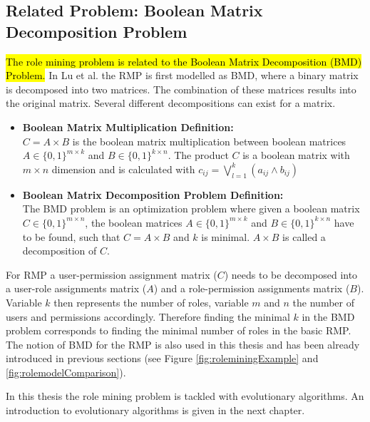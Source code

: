    \subsection{Related Problem: Boolean Matrix Decomposition Problem}
    \hl{The role mining problem is related to the Boolean Matrix Decomposition (BMD) Problem.} In Lu et al.\cite{4497438} the RMP is first modelled as BMD, where a binary matrix is decomposed into two matrices. The combination of these matrices results into the original matrix. Several different decompositions can exist for a matrix.
    \begin{itemize}
    \item \textbf{Boolean Matrix Multiplication Definition:}\\
    $C = A \times B$ is the boolean matrix multiplication between boolean matrices $A \in \{0,1\}^{m \times k}$ and $B \in \{0,1\}^{k \times n}$. The product $C$ is a boolean matrix with $m \times n$ dimension and is calculated with $c_{ij} = \bigvee_{l=1}^{k}(a_{ij} \wedge b_{ij})$
     \item \textbf{Boolean Matrix Decomposition Problem Definition:}\\
    The BMD problem is an optimization problem where given a boolean matrix $C \in \{0,1\}^{m \times n}$, the boolean matrices $A \in \{0,1\}^{m \times k}$ and $B \in \{0,1\}^{k \times n}$ have to be found, such that $C = A \times B$ and $k$ is minimal\cite{vaidya2012boolean}. $A \times B$ is called a decomposition of $C$.
    \end{itemize}
    For RMP a user-permission assignment matrix ($C$) needs to be decomposed into a user-role assignments matrix ($A$) and a role-permission assignments matrix ($B$). Variable $k$ then represents the number of roles, variable $m$ and $n$ the number of users and permissions accordingly. Therefore finding the minimal $k$ in the BMD problem corresponds to finding the minimal number of roles in the basic RMP. The notion of BMD for the RMP is also used in this thesis and has been already introduced in previous sections (see Figure \ref{fig:roleminingExample} and \ref{fig:rolemodelComparison}).
    
\newline
In this thesis the role mining problem is tackled with evolutionary algorithms. An introduction to evolutionary algorithms is given in the next chapter.